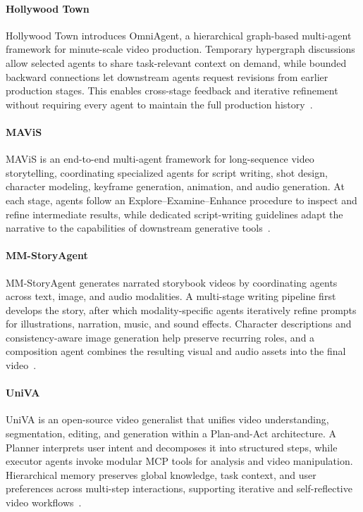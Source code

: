 \paragraph{Hollywood Town}
Hollywood Town introduces OmniAgent, a hierarchical graph-based multi-agent framework for minute-scale video production. Temporary hypergraph discussions allow selected agents to share task-relevant context on demand, while bounded backward connections let downstream agents request revisions from earlier production stages. This enables cross-stage feedback and iterative refinement without requiring every agent to maintain the full production history~\cite{avg251022431}.

\paragraph{MAViS}
MAViS is an end-to-end multi-agent framework for long-sequence video storytelling, coordinating specialized agents for script writing, shot design, character modeling, keyframe generation, animation, and audio generation. At each stage, agents follow an Explore--Examine--Enhance procedure to inspect and refine intermediate results, while dedicated script-writing guidelines adapt the narrative to the capabilities of downstream generative tools~\cite{avg250808487}.

\paragraph{MM-StoryAgent}
MM-StoryAgent generates narrated storybook videos by coordinating agents across text, image, and audio modalities. A multi-stage writing pipeline first develops the story, after which modality-specific agents iteratively refine prompts for illustrations, narration, music, and sound effects. Character descriptions and consistency-aware image generation help preserve recurring roles, and a composition agent combines the resulting visual and audio assets into the final video~\cite{avg250305242}.

\paragraph{UniVA}
UniVA is an open-source video generalist that unifies video understanding, segmentation, editing, and generation within a Plan-and-Act architecture. A Planner interprets user intent and decomposes it into structured steps, while executor agents invoke modular MCP tools for analysis and video manipulation. Hierarchical memory preserves global knowledge, task context, and user preferences across multi-step interactions, supporting iterative and self-reflective video workflows~\cite{avg251108521}.

